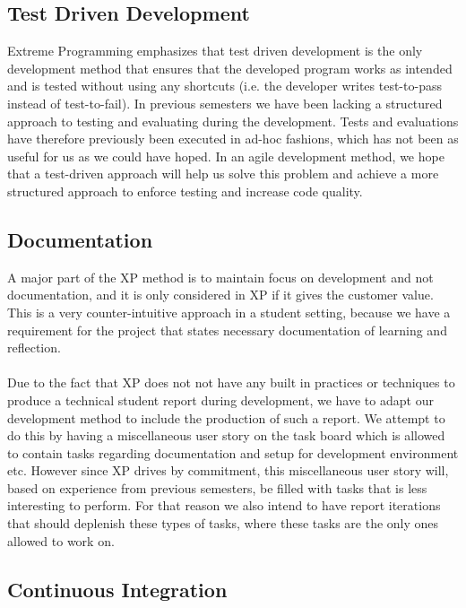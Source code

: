 \subsection{Test Driven Development}
\label{sub:test_driven_development}
Extreme Programming emphasizes that test driven development is the only development method that ensures that the developed program works as intended and is tested without using any shortcuts (i.e. the developer writes test-to-pass instead of test-to-fail). In previous semesters we have been lacking a structured approach to testing and evaluating during the development. Tests and evaluations have therefore previously been executed in ad-hoc fashions, which has not been as useful for us as we could have hoped. In an agile development method, we hope that a test-driven approach will help us solve this problem and achieve a more structured approach to enforce testing and increase code quality.

\subsection{Documentation}
A major part of the XP method is to maintain focus on development and not documentation, and it is only considered in XP if it gives the customer value. This is a very counter-intuitive approach in a student setting, because we have a requirement for the project that states necessary documentation of learning and reflection. 
\\\\
Due to the fact that XP does not not have any built in practices or techniques to produce a technical student report during development, we have to adapt our development method to include the production of such a report. We attempt to do this by having a miscellaneous user story on the task board which is allowed to contain tasks regarding documentation and setup for development environment etc. However since XP drives by commitment, this miscellaneous user story will, based on experience from previous semesters, be filled with tasks that is less interesting to perform. For that reason we also intend to have report iterations that should deplenish these types of tasks, where these tasks are the only ones allowed to work on.

\subsection{Continuous Integration}
\label{sub:continuous_integration}

